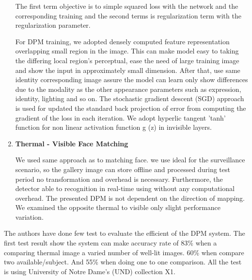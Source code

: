 \documentclass[a4paper, 12pt]{article}
\begin{document}
\begin{enumerate}[I]
The first term objective is to simple squared loss with the network and the corresponding training and the second terms is regularization term with the regularization parameter.
 
For DPM training, we adopted densely computed feature representation overlapping small region in the image. This can make model easy to taking the differing local region's perceptual, ease the need of large training image and show the input in approximately small dimension. After that, use same identity corresponding image assure the model can learn only show differences due to the modality as the other appearance parameters such as expression, identity, lighting and so on. The stochastic gradient descent (SGD) \cite{sgd} approach is used for updated the standard back projection of error from computing the gradient of the loss in each iteration. We adopt hyperlic tangent 'tanh' function for non linear activation function g (z) in invisible layers.

\item\textbf{{\large  Thermal - Visible Face Matching}}

We used same approach as \cite{3} to matching face. we use ideal for the surveillance scenario, so the gallery image can store offline and processed during test period no transformation and overhead is necessary. Furthermore, the detector able to recognition in real-time using without any computational overhead. The presented DPM is not dependent on the direction of mapping. We examined the opposite thermal to visible only slight performance variation.  

\end{enumerate}
The authors have done few test to evaluate the efficient of the DPM system. The first test result show the system can make accuracy rate of 83\% when a comparing thermal image a varied number of well-lit images. 60\% when compare two available/subject. And 55\% when doing one to one comparison. All the test is using University of Notre Dame's (UND) collection X1.
  
{}
\end{document}

